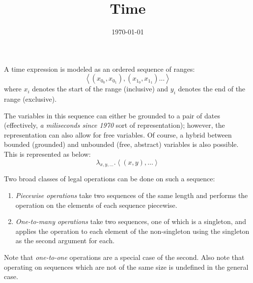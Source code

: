 \documentclass{article}
\begin{document}
\title{Time}
\author{}
\date{\today}
\maketitle

\def\second#1{\ensuremath{#1_{second}}}
\def\minute#1{\ensuremath{#1_{minute}}}
\def\hour#1{\ensuremath{#1_{hour}}}
\def\day#1{\ensuremath{#1_{day}}}
\def\week#1{\ensuremath{#1_{week}}}
\def\month#1{\ensuremath{#1_{month}}}
\def\year#1{\ensuremath{#1_{year}}}


A time expression is modeled as an ordered sequence of ranges:
\begin{equation*}
	\left< (x_{0_0}, x_{0_1}), (x_{1_0}, x_{1_1})\dots \right>
\end{equation*}
where $x_i$ denotes the start of the range (inclusive) and $y_i$ denotes
	the end of the range (exclusive).

The variables in this sequence can either be grounded to a pair of dates
	(effectively, {\em a miliseconds since 1970} sort of representation);
however, the representation can also allow for free variables.
Of course, a hybrid between bounded (grounded) and unbounded (free, abstract)
	variables is also possible.
This is represented as below:
\begin{equation*}
	\lambda_{x,y,\dots}
		. \left< (x, y), \dots \right>
\end{equation*}

Two broad classes of legal operations can be done on such a sequence:
\begin{enumerate}
	\item {\em Piecewise operations} take two sequences of the same length
		and performs the operation on the elements of each sequence piecewise.
	\item {\em One-to-many operations} take two sequences, one of which is
		a singleton, and applies the operation to each element of the non-singleton
		using the singleton as the second argument for each.
\end{enumerate}
Note that {\em one-to-one} operations are a special case of the second.
Also note that operating on sequences which are not of the same size is
	undefined in the general case.
\end{document}

